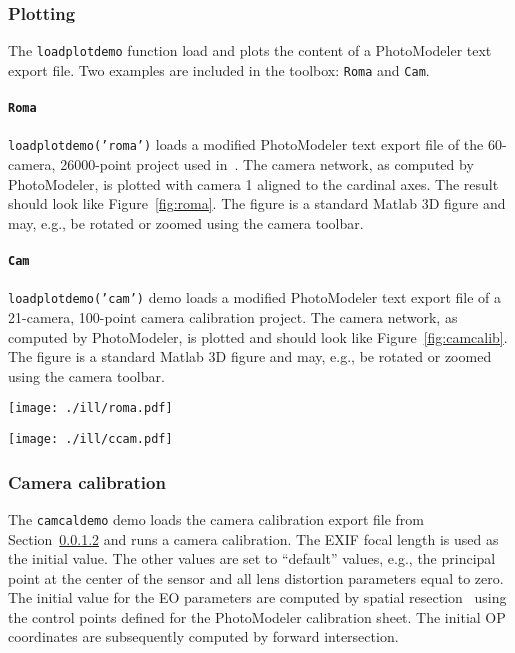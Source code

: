 \documentclass{article}
\begin{document}
\subsubsection{Plotting}
\label{sec:loadplotdemo}
The \texttt{loadplotdemo} function load and plots the content of a
PhotoModeler text export file. Two examples are included in the
toolbox: \texttt{Roma} and \texttt{Cam}.

\paragraph{\texttt{Roma}}
\label{sec:org06b1fab}

\texttt{loadplotdemo('roma')} loads a modified PhotoModeler text export file
of the 60-camera, 26000-point project used
in~\citet{Borlin2013:Bundle}. The camera network, as computed by
PhotoModeler, is plotted with camera 1 aligned to the cardinal axes.
The result should look like Figure~\ref{fig:roma}. The figure is a
standard Matlab 3D figure and may, e.g., be rotated or zoomed using
the camera toolbar.

\paragraph{\texttt{Cam}}
\label{sec:camcaldata}
\texttt{loadplotdemo('cam')} demo loads a modified PhotoModeler text export
file of a 21-camera, 100-point camera calibration project. The camera
network, as computed by PhotoModeler, is plotted and should look like
Figure~\ref{fig:camcalib}. The figure is a standard Matlab 3D figure and
may, e.g., be rotated or zoomed using the camera toolbar.


\begin{figure*}[tbp]
\centering
\texttt{[image: ./ill/roma.pdf]}
\caption{\label{fig:roma}The figure generated by the \texttt{loadplotdemo} demo.}
\end{figure*}

\begin{figure*}[tbp]
\centering
\texttt{[image: ./ill/ccam.pdf]}
\caption{\label{fig:camcalib}The figure generated by the \texttt{loadplotdemo('cam')} demo.}
\end{figure*}

\subsubsection{Camera calibration}
\label{sec:org3f03330}

The \texttt{camcaldemo} demo loads the camera calibration export file from
Section~\ref{sec:camcaldata} and runs a camera calibration. The
EXIF focal length is used as the initial value. The other values are
set to ``default'' values, e.g., the principal point at the center of
the sensor and all lens distortion parameters equal to zero. The
initial value for the EO parameters are computed by spatial
resection~\citep[Chap.~11.1.3.4]{Haralick1994:Review,McGlone2004:Manual}
using the control points defined for the PhotoModeler calibration
sheet. The initial OP coordinates are subsequently computed by forward
intersection.
\end{document}
